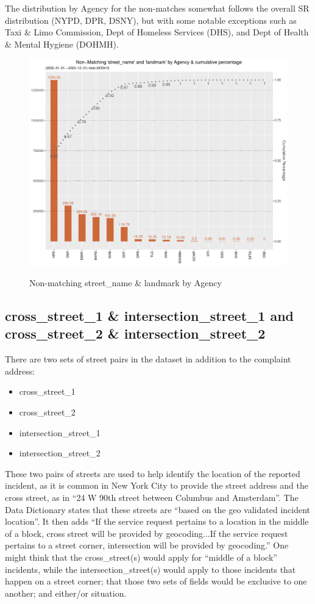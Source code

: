 \documentclass[12pt, titlepage]{article}
\begin{document}
{The distribution by Agency for the non-matches somewhat follows the overall SR distribution (NYPD, DPR, DSNY), 
but with some notable exceptions such as Taxi \& Limo Commission, Dept of Homeless Services (DHS),
 and Dept of Health \& Mental Hygiene (DOHMH).

\begin{figure}[tbp]
		 \centering
		  \caption{Non-matching street\_name \& landmark by Agency }
		 \includegraphics[width = \textwidth]{non-matchingstreet_nameandlandmark.pdf}
		 \label{fig:landmarkchart}
	\end{figure}	
	
	
\subsection{cross\_street\_1 \& intersection\_street\_1 and cross\_street\_2 \& intersection\_street\_2}
There are two sets of street pairs in the dataset in addition to the complaint address:

	\begin{itemize}
		\item cross\_street\_1
		\item cross\_street\_2
		\item intersection\_street\_1
		\item intersection\_street\_2
	\end{itemize}
	
These two pairs of streets are used to help identify the location of the reported incident, as it is common in
New York City to provide the street address and the cross street, as in ``24 W 90th street between Columbus and
Amsterdam''. The Data Dictionary states that these streets are
 ``based on the geo validated incident location''. It then adds ``If the service request 
pertains to a location in the middle of a block, cross street will be provided by geocoding...If the service request 
pertains to a street corner, intersection will be provided by geocoding.''  One might think that the
cross\_street(s) would apply for ``middle of a block'' incidents, while the intersection\_street(s) would
apply to those incidents that happen on a street corner; that those two sets of fields would be
exclusive to one another; and either/or situation. 

}
\end{document}

